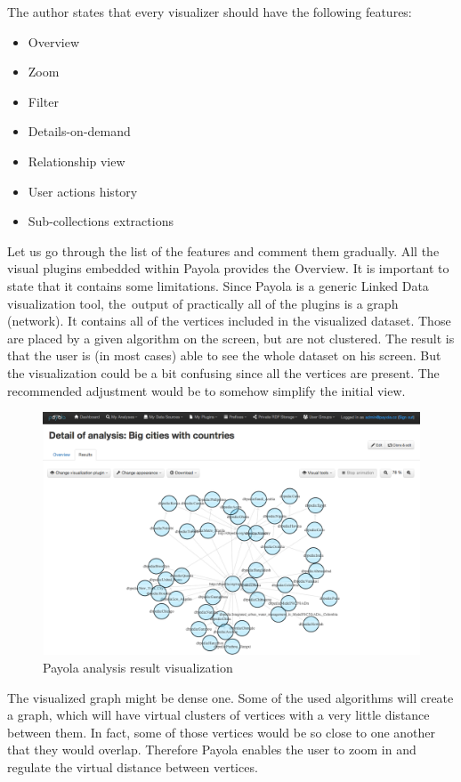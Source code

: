 The author states that every visualizer should have the following features:

\begin{itemize}
\item Overview
\item Zoom
\item Filter
\item Details-on-demand
\item Relationship view
\item User actions history
\item Sub-collections extractions
\end{itemize}

Let us go through the list of the features and comment them gradually. All the visual plugins
embedded within Payola provides the Overview. It is important to state
that it contains some limitations. Since Payola is a generic Linked Data visualization tool,
the~output of practically all of the plugins is a graph (network). It contains all of the vertices
included in the visualized dataset. Those are placed by a given algorithm on the screen, but are not clustered. The result is that the user is (in most cases) able to see the whole dataset on his screen. But the visualization could be a bit confusing since all the vertices are present. The recommended adjustment would be to somehow simplify the initial view.

\begin{figure}
	\centering
	\includegraphics[width=140mm]{img/payola.png}
	\caption{Payola analysis result visualization}
	\label{fig:palyola-vis}
\end{figure}


The visualized graph might be dense one. Some of the used algorithms will create a graph, which
will have virtual clusters of vertices with a very little distance between them. In fact, some of those
vertices would be so close to one another that they would overlap. Therefore Payola enables the
user to zoom in and regulate the virtual distance between vertices.

